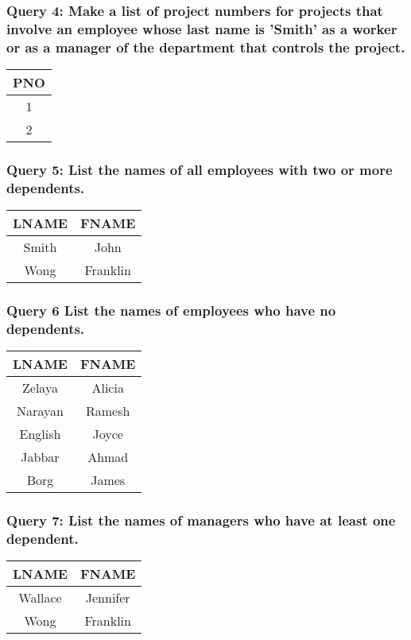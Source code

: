 \subsubsection*{Query 4: Make a list of project numbers for projects that involve an employee whose last name is 'Smith' as a worker or as a manager of the department that controls the project.}
\begin{center}
\begin{tabular}{ c }
  PNO \\ \hline
  1 \\
  2 \\
\end{tabular}
\end{center}

\subsubsection*{Query 5: List the names of all employees with two or more dependents.}
\begin{center}
\begin{tabular}{ c | c }
  LNAME & FNAME \\ \hline
  Smith & John \\
  Wong & Franklin \\
\end{tabular}
\end{center}

\subsubsection*{Query 6 List the names of employees who have no dependents.}
\begin{center}
\begin{tabular}{ c | c }
  LNAME & FNAME \\ \hline
  Zelaya & Alicia \\
  Narayan & Ramesh \\
  English & Joyce \\
  Jabbar & Ahmad \\
  Borg & James \\
\end{tabular}
\end{center}

\subsubsection*{Query 7: List the names of managers who have at least one dependent.}
\begin{center}
\begin{tabular}{ c | c }
  LNAME & FNAME \\ \hline
  Wallace & Jennifer \\
  Wong & Franklin \\
\end{tabular}
\end{center}

